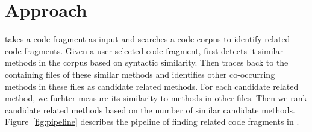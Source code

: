 \section{Approach}
\label{sec:approach}
{\tool} takes a code fragment as input and searches a code corpus to identify related code fragments. Given a user-selected code fragment, {\tool} first detects it similar methods in the corpus based on syntactic similarity. Then {\tool} traces back to the containing files of these similar methods and identifies other co-occurring methods in these files as candidate related methods. For each candidate related method, we furhter measure its similarity to methods in other files. Then we rank candidate related methods based on the number of similar candidate methods. Figure~\ref{fig:pipeline} describes the pipeline of finding related code fragments in {\tool}. 


